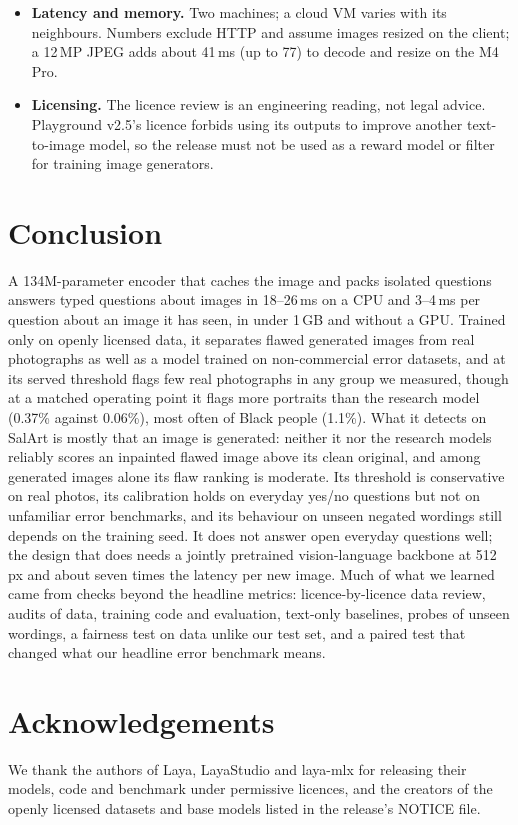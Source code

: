 \documentclass[10pt]{article}
\begin{document}
\begin{itemize}
\item \textbf{Latency and memory.} Two machines; a cloud VM varies with its neighbours. Numbers exclude HTTP and assume images resized on the client; a 12\,MP JPEG adds about 41\,ms (up to 77) to decode and resize on the M4 Pro.
\item \textbf{Licensing.} The licence review is an engineering reading, not legal advice. Playground v2.5's licence forbids using its outputs to improve another text-to-image model, so the release must not be used as a reward model or filter for training image generators.
\end{itemize}

\section{Conclusion}
A 134M-parameter encoder that caches the image and packs isolated questions answers typed questions about images in 18--26\,ms on a CPU and 3--4\,ms per question about an image it has seen, in under 1\,GB and without a GPU. Trained only on openly licensed data, it separates flawed generated images from real photographs as well as a model trained on non-commercial error datasets, and at its served threshold flags few real photographs in any group we measured, though at a matched operating point it flags more portraits than the research model (0.37\% against 0.06\%), most often of Black people (1.1\%). What it detects on SalArt is mostly that an image is generated: neither it nor the research models reliably scores an inpainted flawed image above its clean original, and among generated images alone its flaw ranking is moderate. Its threshold is conservative on real photos, its calibration holds on everyday yes/no questions but not on unfamiliar error benchmarks, and its behaviour on unseen negated wordings still depends on the training seed. It does not answer open everyday questions well; the design that does needs a jointly pretrained vision-language backbone at 512\,px and about seven times the latency per new image. Much of what we learned came from checks beyond the headline metrics: licence-by-licence data review, audits of data, training code and evaluation, text-only baselines, probes of unseen wordings, a fairness test on data unlike our test set, and a paired test that changed what our headline error benchmark means.

\section*{Acknowledgements}
We thank the authors of Laya, LayaStudio and laya-mlx for releasing their models, code and benchmark under permissive licences, and the creators of the openly licensed datasets and base models listed in the release's NOTICE file.
\end{document}
